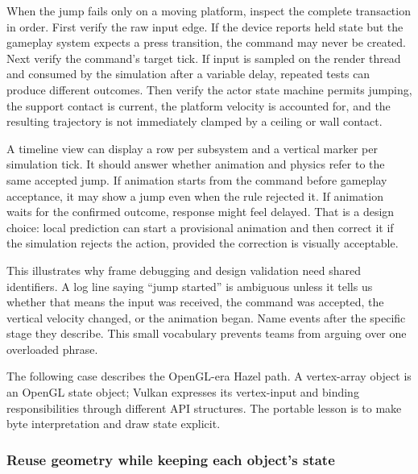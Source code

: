\hypertarget{06-engine-ii-ch026-diagnose-a-frame-as-a-pipeline}{}

When the jump fails only on a moving platform, inspect the complete transaction in order. First verify the raw input edge. If the device reports held state but the gameplay system expects a press transition, the command may never be created. Next verify the command's target tick. If input is sampled on the render thread and consumed by the simulation after a variable delay, repeated tests can produce different outcomes. Then verify the actor state machine permits jumping, the support contact is current, the platform velocity is accounted for, and the resulting trajectory is not immediately clamped by a ceiling or wall contact.

A timeline view can display a row per subsystem and a vertical marker per simulation tick. It should answer whether animation and physics refer to the same accepted jump. If animation starts from the command before gameplay acceptance, it may show a jump even when the rule rejected it. If animation waits for the confirmed outcome, response might feel delayed. That is a design choice: local prediction can start a provisional animation and then correct it if the simulation rejects the action, provided the correction is visually acceptable.

This illustrates why frame debugging and design validation need shared identifiers. A log line saying ``jump started'' is ambiguous unless it tells us whether that means the input was received, the command was accepted, the vertical velocity changed, or the animation began. Name events after the specific stage they describe. This small vocabulary prevents teams from arguing over one overloaded phrase.

The following case describes the OpenGL-era Hazel path. A vertex-array object is an OpenGL state object; Vulkan expresses its vertex-input and binding responsibilities through different API structures. The portable lesson is to make byte interpretation and draw state explicit.

\subsubsection{Reuse geometry while keeping each object's state}\label{06-engine-ii-ch026-reuse-geometry-while-keeping-each-objects-state}

\hypertarget{06-engine-ii-ch026-reuse-geometry-while-keeping-each-objects-state}{}

